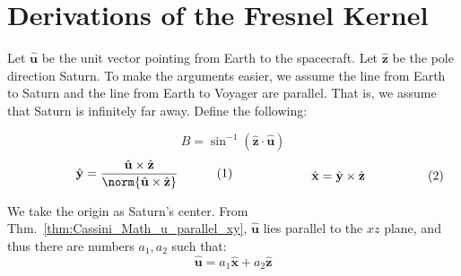 \documentclass[crop=false,class=book,oneside]{standalone}
\begin{document}
    \section{Derivations of the Fresnel Kernel}
            Let $\hat{\mathbf{u}}$ be the unit
            vector pointing from Earth to the spacecraft.
            Let $\hat{\mathbf{z}}$ be the pole direction
            Saturn. To make the arguments easier,
            we assume the line from Earth to Saturn
            and the line from Earth to Voyager are
            parallel. That is, we assume that
            Saturn is infinitely far away.
            Define the following:
            \par
            \begin{equation}
                \label{eqn:Cassini_Math_Def_B}
                B=
                \sin^{-1}(\hat{\mathbf{z}}\cdot\hat{\mathbf{u}})
            \end{equation}
            \begin{subequations}
                \begin{minipage}{0.49\textwidth}
                    \begin{equation}
                        \hat{\mathbf{y}}=
                        \frac{\hat{\mathbf{u}}\times
                              \hat{\mathbf{z}}}
                             {\norm{\hat{\mathbf{u}}\times
                              \hat{\mathbf{z}}}}
                    \end{equation}
                \end{minipage}
                \hfill
                \begin{minipage}{0.49\textwidth}
                    \begin{equation}
                        \hat{\mathbf{x}}
                        =\hat{\mathbf{y}}\times
                        \hat{\mathbf{z}}
                    \end{equation}
                \end{minipage}
            \end{subequations}
            \par\hfill\par
            We take the origin as Saturn's center. From
            Thm.~\ref{thm:Cassini_Math_u_parallel_xy},
            $\hat{\mathbf{u}}$ lies parallel to the
            $xz$ plane, and thus there are numbers
            $a_{1},a_{2}$ such that:
            \begin{equation}
                \hat{\mathbf{u}}=a_{1}\hat{\mathbf{x}}+
                a_{2}\hat{\mathbf{z}}
            \end{equation}
\end{document}
